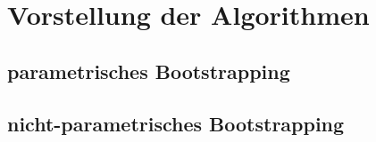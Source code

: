 \chapter{Vorstellung der Algorithmen}
\label{chapter:kap3}

\section{parametrisches Bootstrapping}

\section{nicht-parametrisches Bootstrapping}